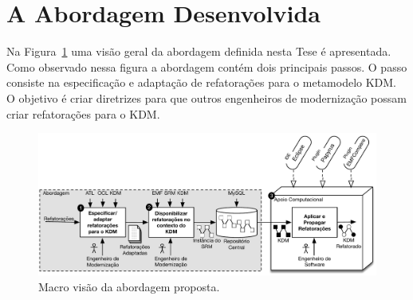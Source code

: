 

\section{A Abordagem Desenvolvida}\label{sec:introducao:a_abordagem_desenvolvida}

Na Figura~\ref{fig:abordagem_kdm_tese_processo} uma visão geral da abordagem definida nesta Tese é apresentada. Como observado nessa figura a abordagem contém dois principais passos. O passo  consiste na especificação e adaptação de refatorações para o metamodelo KDM. O objetivo é criar diretrizes para que outros engenheiros de modernização possam criar refatorações para o KDM. %

\begin{figure}[h]
	\centering
	\caption{Macro visão da abordagem proposta.}
	\label{fig:abordagem_kdm_tese_processo}
	\includegraphics[scale=0.75]{images/Micro_visao_do_doutorado3}
	\fautor
\end{figure}

